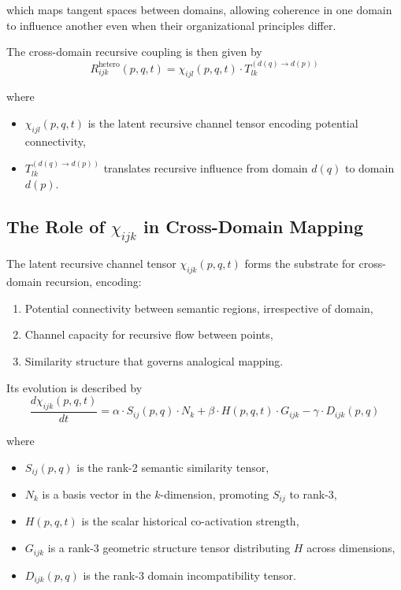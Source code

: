 which maps tangent spaces between domains, allowing coherence in one domain to influence another even when their organizational principles differ.

The cross-domain recursive coupling is then given by
\begin{equation}
R_{ijk}^{\text{hetero}}(p, q, t) = \chi_{ijl}(p, q, t) \cdot T_{lk}^{(d(q) \to d(p))}
\end{equation}

where
\begin{itemize}
    \item \(\chi_{ijl}(p, q, t)\) is the latent recursive channel tensor encoding potential connectivity,
    \item \(T_{lk}^{(d(q) \to d(p))}\) translates recursive influence from domain \(d(q)\) to domain \(d(p)\).
\end{itemize}

\subsection[The Role of chi_ijk in Cross-Domain Mapping]{The Role of \(\chi_{ijk}\) in Cross-Domain Mapping}

The latent recursive channel tensor \(\chi_{ijk}(p, q, t)\) forms the substrate for cross-domain recursion, encoding:
\begin{enumerate}
    \item Potential connectivity between semantic regions, irrespective of domain,
    \item Channel capacity for recursive flow between points,
    \item Similarity structure that governs analogical mapping.
\end{enumerate}

Its evolution is described by
\begin{equation}
\frac{d\chi_{ijk}(p, q, t)}{dt} = \alpha \cdot S_{ij}(p, q) \cdot N_k + \beta \cdot H(p, q, t) \cdot G_{ijk} - \gamma \cdot D_{ijk}(p, q)
\end{equation}

where
\begin{itemize}
    \item \(S_{ij}(p, q)\) is the rank-2 semantic similarity tensor,
    \item \(N_k\) is a basis vector in the \(k\)-dimension, promoting \(S_{ij}\) to rank-3,
    \item \(H(p, q, t)\) is the scalar historical co-activation strength,
    \item \(G_{ijk}\) is a rank-3 geometric structure tensor distributing \(H\) across dimensions,
    \item \(D_{ijk}(p, q)\) is the rank-3 domain incompatibility tensor.
\end{itemize}

